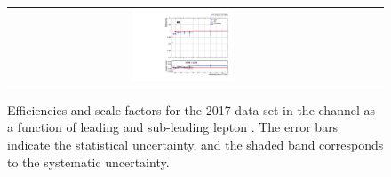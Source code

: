 \begin{figure}[htb]
\begin{center}
\begin{tabular}{ccc}
      \includegraphics[width=0.30\textwidth]{fig_2017_TrigSF/g_ee_lepBpt_FullSystUncBand.pdf}\\
    \end{tabular}
    \caption{Efficiencies and scale factors for the 2017 data set in the \ee channel as a function of leading and sub-leading lepton \pT.
            The error bars indicate the statistical uncertainty, and the shaded band corresponds to the systematic uncertainty.
            }
    \label{TrigSF_2017_2}
  \end{center}
\end{figure}

